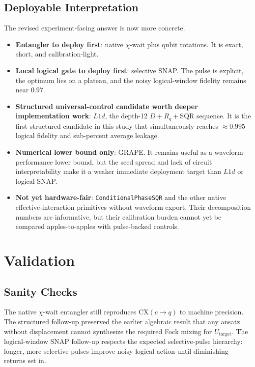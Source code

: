 \documentclass[11pt, a4paper]{article}
\begin{document}
\subsection{Deployable Interpretation}

The revised experiment-facing answer is now more concrete.
\begin{itemize}
\item \textbf{Entangler to deploy first}: native $\chi$-wait plus qubit rotations. It is exact, short, and calibration-light.
\item \textbf{Local logical gate to deploy first}: selective SNAP. The pulse is explicit, the optimum lies on a plateau, and the noisy logical-window fidelity remains near $0.97$.
\item \textbf{Structured universal-control candidate worth deeper implementation work}: $L1d$, the depth-12 $D+R_q+\mathrm{SQR}$ sequence. It is the first structured candidate in this study that simultaneously reaches $\approx 0.995$ logical fidelity and sub-percent average leakage.
\item \textbf{Numerical lower bound only}: GRAPE. It remains useful as a waveform-performance lower bound, but the seed spread and lack of circuit interpretability make it a weaker immediate deployment target than $L1d$ or logical SNAP.
\item \textbf{Not yet hardware-fair}: \texttt{ConditionalPhaseSQR} and the other native effective-interaction primitives without waveform export. Their decomposition numbers are informative, but their calibration burden cannot yet be compared apples-to-apples with pulse-backed controls.
\end{itemize}

\section{Validation}
\label{sec:validation}

\subsection{Sanity Checks}

The native $\chi$-wait entangler still reproduces $\mathrm{CX}(c\!\to\! q)$ to machine precision. The structured follow-up preserved the earlier algebraic result that any ansatz without displacement cannot synthesize the required Fock mixing for $U_{\mathrm{target}}$. The logical-window SNAP follow-up respects the expected selective-pulse hierarchy: longer, more selective pulses improve noisy logical action until diminishing returns set in.
\end{document}
